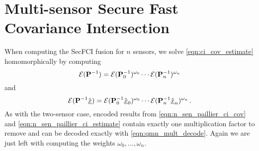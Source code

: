 \documentclass[letterpaper, 10 pt, conference]{ieeeconf}  %
\begin{document}
\section{Multi-sensor Secure Fast Covariance Intersection} \label{sec:multi_secfci}
When computing the SecFCI fusion for $n$ sensors, we solve \eqref{eqn:ci_cov_estimate} homomorphically by computing
\begin{equation}
   \mathcal{E}({{\mathbf{P}}}^{-1}) = \mathcal{E}({{\mathbf{P}}}^{-1}_0)^{\omega_0}\cdots\mathcal{E}({{\mathbf{P}}}^{-1}_n)^{\omega_n} \label{eqn:n_sen_paillier_ci_cov}
\end{equation}
and
\begin{equation}
   \mathcal{E}({{\mathbf{P}}}^{-1}\hat{{\underline{x}}}) = \mathcal{E}({{\mathbf{P}}}^{-1}_0\hat{{\underline{x}}}_0)^{\omega_0}\cdots\mathcal{E}({{\mathbf{P}}}^{-1}_n\hat{{\underline{x}}}_n)^{\omega_n}\,. \label{eqn:n_sen_paillier_ci_estimate}
\end{equation}
As with the two-sensor case, encoded results from \eqref{eqn:n_sen_paillier_ci_cov} and \eqref{eqn:n_sen_paillier_ci_estimate} contain exactly one multiplication factor to remove and can be decoded exactly with \eqref{eqn:qmn_mult_decode}. Again we are just left with computing the weights $\omega_0,\dots,\omega_n$.
\end{document}
